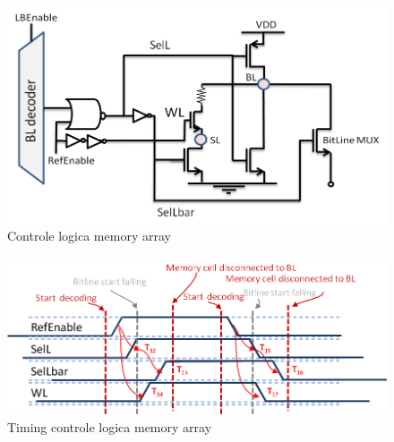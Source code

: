 \begin{figure}[!ht]
  \centering
  \includegraphics[scale=0.6]{../fig/hfdstk-timing-lbref1.png}
  \caption{Controle logica memory array}
  \label{fig:lbref_timing1}
\end{figure}

\begin{figure}[!ht]
  \centering
  \includegraphics[scale=0.9]{../fig/hfdstk-timing-lbref2.png}
  \caption{Timing controle logica memory array}
  \label{fig:lbref_timing2}
\end{figure}

